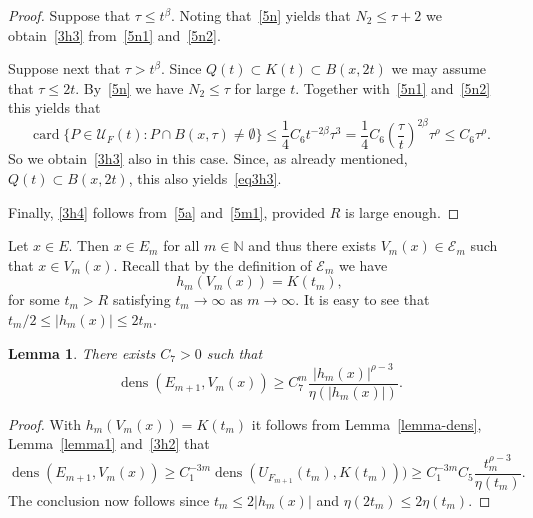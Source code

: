 \documentclass[12pt,a4paper]{amsart}
\theoremstyle{plain}
\newtheorem{lemma}[theorem]{Lemma}
\theoremstyle{definition}
\theoremstyle{remark}
\def\N{\mathbb N}
\def\cE{\mathcal E}
\def\cU{\mathcal U}
\def\dens{\operatorname{dens}}
\def\card{\operatorname{card}}
\numberwithin{equation}{section}
\begin{document}
\begin{proof}
Suppose that $\tau\leq t^\beta$. 
Noting that~\eqref{5n} yields that $N_2\leq \tau+2$ we obtain~\eqref{3h3}
from~\eqref{5n1} and~\eqref{5n2}.

Suppose next that $\tau> t^\beta$.
Since $Q(t)\subset K(t)\subset B(x,2t)$ we may assume that $\tau\leq 2t$.
By~\eqref{5n} we have $N_2\leq \tau$ for large $t$.
Together with~\eqref{5n1} and~\eqref{5n2} this yields that 
\begin{equation}\label{5n3}
\card\{P\in  \cU_F(t)\colon P\cap B(x,\tau)\neq\emptyset\}
\leq \frac14 C_6 t^{-2\beta} \tau^3
=\frac14 C_6 \left(\frac{\tau}{t}\right)^{2\beta} \tau^\rho\leq C_6 \tau^\rho.
\end{equation}
So we obtain~\eqref{3h3} also in this case.
Since, as already mentioned, $Q(t)\subset B(x,2t)$, this also yields~\eqref{eq3h3}.

Finally, \eqref{3h4} follows from~\eqref{5a} and~\eqref{5m1}, provided
$R$ is large enough.
\end{proof}

Let $x\in E$. Then $x\in E_m$ for all $m\in\N$ and thus there exists 
$V_m(x)\in\cE_m$ such that $x\in V_m(x)$.
Recall that by the definition of $\cE_m$ we have 
\begin{equation}\label{eq3h}h_m(V_m(x))=K(t_m),\end{equation} for some $t_m>R$ satisfying
$t_m\to\infty$ as $m\to\infty$.
It is easy to see that  $t_m/2\leq |h_m(x)|\leq 2 t_m$.
\begin{lemma} \label{lemma4}
There exists $C_7>0$ such that 
\begin{equation}\label{3i}
\dens(E_{m+1},V_m(x))\geq C_7^{m}  \frac{|h_m(x)|^{\rho-3}}{\eta(|h_m(x)|)}.
\end{equation}
\end{lemma}
\begin{proof}
With $h_m(V_m(x))=K(t_m)$
it follows from Lemma~\ref{lemma-dens}, Lemma~\ref{lemma1} and~\eqref{3h2} that
\begin{equation}\label{5o}
\dens(E_{m+1},V_m(x)) \geq C_1^{-3m} \dens(U_{F_{m+1}}(t_m),K(t_m)))
 \geq C_1^{-3m}  C_5 \frac{t_m^{\rho-3}}{\eta(t_m)}.
\end{equation}
The conclusion now follows since $t_m\leq 2|h_m(x)|$
and $\eta(2t_m)\leq 2\eta(t_m)$.
\end{proof}
\end{document}
